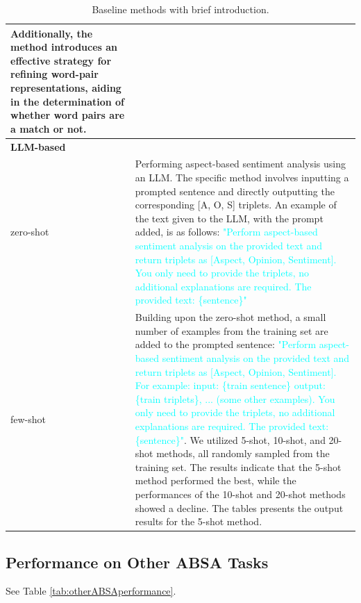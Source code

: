 \documentclass[11pt]{article}
\begin{document}
\begin{table}
{\begin{tabular}{lp{40em}}
    Additionally, the method introduces an effective strategy for refining word-pair representations, aiding in the determination of whether word pairs are a match or not.\\
    \midrule
    \textbf{LLM-based} &    \\
    zero-shot & Performing aspect-based sentiment analysis using an LLM. The specific method involves inputting a prompted sentence and directly outputting the corresponding [A, O, S] triplets. An example of the text given to the LLM, with the prompt added, is as follows: \textcolor{cyan}{"Perform aspect-based sentiment analysis on the provided text and return triplets as [Aspect, Opinion, Sentiment]. You only need to provide the triplets, no additional explanations are required. The provided text: \{sentence\}"}\\ 

    few-shot & Building upon the zero-shot method, a small number of examples from the training set are added to the prompted sentence: \textcolor{cyan}{"Perform aspect-based sentiment analysis on the provided text and return triplets as [Aspect, Opinion, Sentiment]. For example: input: \{train sentence\} output: \{train triplets\}, ... (some other examples). You only need to provide the triplets, no additional explanations are required. The provided text: \{sentence\}"}. We utilized 5-shot, 10-shot, and 20-shot methods, all randomly sampled from the training set. The results indicate that the 5-shot method performed the best, while the performances of the 10-shot and 20-shot methods showed a decline. The tables presents the output results for the 5-shot method.\\
    \bottomrule
    \hline
    \end{tabular}%
    }
\caption{Baseline methods with brief introduction.}
\label{tab:baselines}
\end{table}

\subsection{Performance on Other ABSA Tasks}
\label{sec:Performance on Other ABSA Tasks}
See Table \ref{tab:otherABSAperformance}. 
\end{document}
